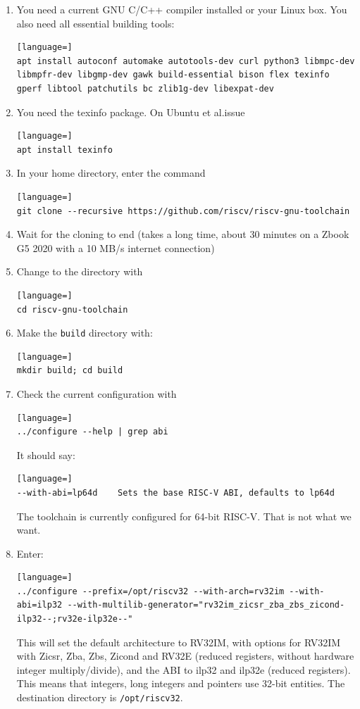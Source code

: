 \documentclass[12pt]{article}
\begin{document}
\begin{enumerate}
\item You need a current GNU C/C++ compiler installed or your Linux box. You also need all essential building tools:
\begin{lstlisting}[language=]
apt install autoconf automake autotools-dev curl python3 libmpc-dev libmpfr-dev libgmp-dev gawk build-essential bison flex texinfo gperf libtool patchutils bc zlib1g-dev libexpat-dev
\end{lstlisting}
\item You need the texinfo package. On Ubuntu et al.\@ issue
\begin{lstlisting}[language=]
apt install texinfo
\end{lstlisting}
\item In your home directory, enter the command
\begin{lstlisting}[language=]
git clone --recursive https://github.com/riscv/riscv-gnu-toolchain
\end{lstlisting}
\item Wait for the cloning to end (takes a long time, about 30 minutes on a Zbook G5 2020 with a 10 MB/s internet connection)
\item Change to the directory with
\begin{lstlisting}[language=]
cd riscv-gnu-toolchain
\end{lstlisting}
\item Make the \lstinline|build| directory with:
\begin{lstlisting}[language=]
mkdir build; cd build
\end{lstlisting}
\item Check the current configuration with
\begin{lstlisting}[language=]
../configure --help | grep abi
\end{lstlisting}
      It should say:
\begin{lstlisting}[language=]
--with-abi=lp64d    Sets the base RISC-V ABI, defaults to lp64d
\end{lstlisting}
The toolchain is currently configured for 64-bit RISC-V. That is not what we want.
\item Enter:
\begin{lstlisting}[language=]
../configure --prefix=/opt/riscv32 --with-arch=rv32im --with-abi=ilp32 --with-multilib-generator="rv32im_zicsr_zba_zbs_zicond-ilp32--;rv32e-ilp32e--"
\end{lstlisting}
This will set the default architecture to RV32IM, with options for RV32IM with Zicsr, Zba, Zbs, Zicond and RV32E (reduced registers, without hardware integer multiply/divide), and the ABI to ilp32 and ilp32e (reduced registers). This means that integers, long integers and pointers use 32-bit entities. The destination directory is \lstinline|/opt/riscv32|.


\end{enumerate}
\end{document}
